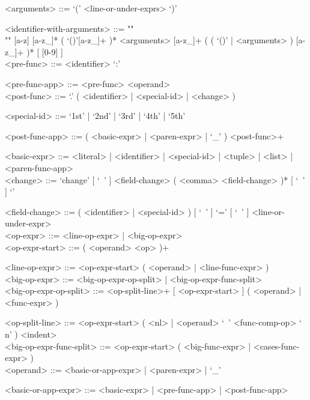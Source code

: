 \documentclass{article}
\begin{document}
\begin{grammar}
<arguments> ::= `(' <line-or-under-exprs> `)'

<identifier-with-arguments> ::= ""\\""
[a-z] [a-z_]* ( `()'[a-z_]+ )* <arguments>
[a-z_]+ ( ( `()' | <arguments> ) [a-z_]+ )* 
[ [0-9] ]
\\

<pre-func> ::= <identifier> `:'

<pre-func-app> ::= <pre-func> <operand>
\\

<post-func> ::= `.' ( <identifier> | <special-id> | <change> )

<special-id> ::= `1st' | `2nd' | `3rd' | `4th' | `5th'

<post-func-app> ::= ( <basic-expr> | <paren-expr> | `_' ) <post-func>+

<basic-expr> ::=
<literal> | <identifier> | <special-id> | <tuple> | <list> | <paren-func-app>
\\

<change> ::=
`change{' [ `\ ' ] <field-change> ( <comma> <field-change> )* [ `\ ' ] `}'

<field-change> ::=
( <identifier> | <special-id> ) [ `\ ' ] `=' [ `\ ' ] <line-or-under-expr>
\\

<op-expr> ::= <line-op-expr> | <big-op-expr>
\\

<op-expr-start> ::= ( <operand> <op> )+

<line-op-expr> ::= <op-expr-start> ( <operand> | <line-func-expr> )
\\

<big-op-expr> ::= 
<big-op-expr-op-split> | <big-op-expr-func-split>
\\

<big-op-expr-op-split> ::= 
<op-split-line>+ [ <op-expr-start> ] ( <operand> | <func-expr> )

<op-split-line> ::=
<op-expr-start> ( <nl> | <operand> `\ ' <func-comp-op> `\\n' ) <indent> 
\\

<big-op-expr-func-split> ::= <op-expr-start> ( <big-func-expr> | <cases-func-expr> )
\\

<operand> ::= <basic-or-app-expr> | <paren-expr> | `_'

<basic-or-app-expr> ::= <basic-expr> | <pre-func-app> | <post-func-app>
\\


\end{grammar}
\end{document}
